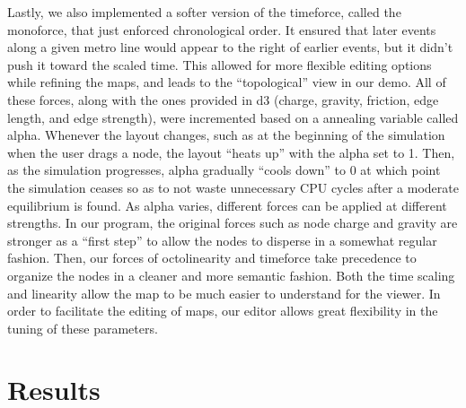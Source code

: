 \documentclass{chi2009}
\begin{document}
Lastly, we also implemented a softer version of the timeforce, called the monoforce, that just enforced chronological order.  It ensured that later events along a given metro line would appear to the right of earlier events, but it didn’t push it toward the scaled time.  This allowed for more flexible editing options while refining the maps, and leads to the “topological” view in our demo.
All of these forces, along with the ones provided in d3 (charge, gravity, friction, edge length, and edge strength), were incremented based on a annealing variable called alpha.  Whenever the layout changes, such as at the beginning of the simulation when the user drags a node, the layout “heats up” with the alpha set to 1.  Then, as the simulation progresses, alpha gradually “cools down” to 0 at which point the simulation ceases so as to not waste unnecessary CPU cycles after a moderate equilibrium is found.  As alpha varies, different forces can be applied at different strengths.  In our program, the original forces such as node charge and gravity are stronger as a “first step” to allow the nodes to disperse in a somewhat regular fashion.  Then, our forces of octolinearity and timeforce take precedence to organize the nodes in a cleaner and more semantic fashion.  Both the time scaling and linearity allow the map to be much easier to understand for the viewer.  In order to facilitate the editing of maps, our editor allows great flexibility in the tuning of these parameters.  

\section{Results}
\end{document}
